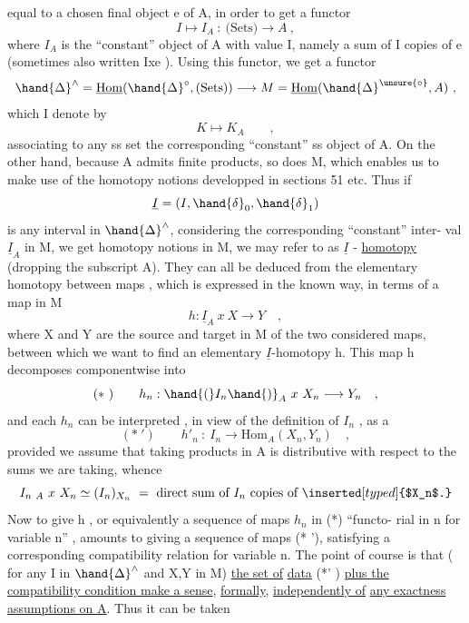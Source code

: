 equal to a chosen final object e of A,  in order to get a functor
\[ I \longmapsto I_A \ : \ \text{(Sets)} \longrightarrow A \ , \]
where $I_A$  is the ``constant'' object of A with value I,  namely a sum of I
copies of e (sometimes also written  Ixe ).  Using this functor,  we get
a functor
\[ \hand{\Delta}^{\wedge} = \underline{\mathrm{Hom}}(\hand{\Delta}^{\circ}, \text{(Sets)}) \longrightarrow M = \underline{\mathrm{Hom}}(\hand{\Delta}^{\unsure{\circ}} , A) \ , \]
which I denote by
\[ K \longmapsto K_A \qquad , \]
associating to any ss set the corresponding ``constant''  ss object of A.
On the other hand,  because A admits finite products,  so does M,  which
enables us to make use of the homotopy notions developped in sections 51
etc.  Thus if
\[ \underline{I} = (I, \hand{\delta}_0, \hand{\delta}_1) \]
is any interval in $\hand{\Delta}^{\wedge}$,  considering the corresponding ``constant''  inter-%
val  $\underline{I}_A$  in M,  we get homotopy notions in M,   we may refer to as
$\underline{I}$ - \uline{homotopy} (dropping the subscript A).  They can all be deduced from the
elementary  homotopy  between maps ,  which  is expressed in the
known way,  in terms of a map in  M
\[ h\colon \underline{I}_A \ x \ X \longrightarrow Y \quad , \]
where X and Y are the source and target in M of the two considered maps,
between which we want to find an  elementary $\underline{I}$-homotopy h.  This
map h  decomposes componentwise into
\[ (*\ ) \qquad h_n : \hand{(}I_n\hand{)}_A \ x \ X_n \longrightarrow Y_n \quad , \]
and each $h_n$ can be interpreted , in view of the definition of $I_n$ ,  as a
\[ (*\ ') \qquad h'_n \ : \ I_n \longrightarrow \mathrm{Hom}_A(X_n,Y_n) \quad , \]
provided we assume that taking products in A is distributive with respect
to the sums we are taking,  whence
\[ I_{n\ A} \ x \ X_n \simeq (I_n)_{X_n} \ = \ \text{direct sum of } I_n \text{ copies of } \inserted[typed]{$X_n$.} \]
Now to give  h ,  or equivalently a sequence of maps $h_n$ in (*)  ``functo-%
rial in n for variable n'' ,  amounts to giving a sequence of maps (* '),
satisfying a corresponding compatibility relation  for variable n.  The
point of course is that  ( for any I in $\hand{\Delta}^{\wedge}$ and  X,Y  in M)  \uline{the set of}
\uline{data} (*' )  \uline{plus the compatibility condition make a sense},  \uline{formally},
\uline{independently of}  \uline{any exactness assumptions on A}.  Thus it can be taken

